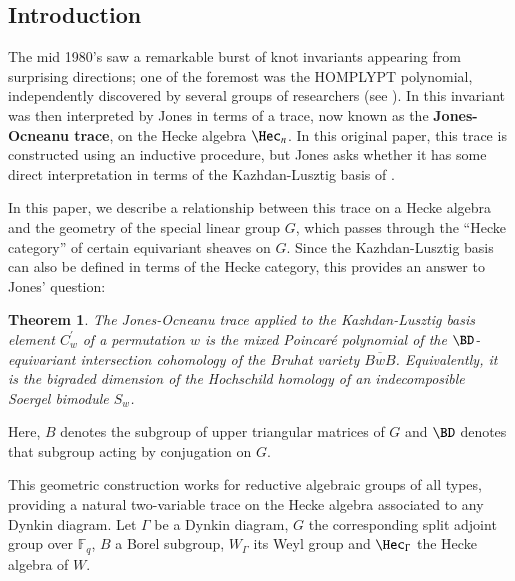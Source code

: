 \documentclass[12pt]{amsart}
\def\ov{\overline}
\newtheorem*{theorem*}{Theorem}
\theoremstyle{remark}
\begin{document}
\subsection{Introduction}
\label{sec:introduction}

The mid 1980's saw a remarkable burst of knot invariants appearing from surprising directions; one of the foremost was the HOMPLYPT polynomial, independently discovered by several groups of researchers (see \cite{HOMFLY,PT}). In \cite{Jon87} this invariant was then interpreted by Jones in terms of a trace, now known as the {\bf Jones-Ocneanu trace}, on the Hecke algebra $\Hec_n$. In this original paper, this trace is constructed using an inductive procedure, but Jones asks whether it has some direct interpretation in terms of the Kazhdan-Lusztig basis of \cite{KL79}.

In this paper, we describe a relationship between this trace on a Hecke
algebra and the geometry of the special linear group $G$, which passes through the ``Hecke category'' of certain equivariant sheaves on $G$. Since the Kazhdan-Lusztig basis can also be defined in terms of the Hecke category, this provides an answer to Jones' question:

\begin{theorem*}
  The Jones-Ocneanu trace applied to the Kazhdan-Lusztig basis element
  $C^{\prime}_w$ of a permutation $w$ is the mixed Poincar\'e polynomial of the $\BD$-equivariant   intersection cohomology of the Bruhat variety $\ov {BwB}$.  Equivalently, it is the
  bigraded dimension of the Hochschild homology of an indecomposible
  Soergel bimodule $S_w$.
\end{theorem*}
Here, $B$ denotes the subgroup of upper triangular matrices of $G$ and $\BD$ denotes that subgroup acting by conjugation on $G$.


This geometric construction works for reductive
algebraic groups of all types, providing a natural two-variable trace on the Hecke
algebra associated to any Dynkin diagram. Let $\Gamma$ be a Dynkin diagram, $G$ the corresponding split adjoint group over $\mathbb{F}_q$, $B$ a Borel subgroup, $W_{\Gamma}$ its Weyl group and $\Hec_{\Gamma}$ the Hecke algebra of $W$.
\end{document}
